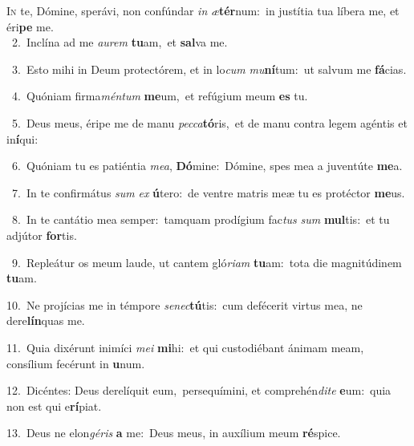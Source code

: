 \lettrine{\initial\textcolor{\initialcolor}{I}}{n} te, Dómine, sperávi, non confúndar \textit{in} \textit{æ}\-\textbf{tér}num:~\star in justítia tua líbera me, et éri\textbf{pe} me.\\
{\numbfont\textcolor{\numbcolor}{~2.}}~Inclína ad me \textit{au}\-\textit{rem} \textbf{tu}\-am,~\star et \textbf{sal}\-va me.\par
{\numbfont\textcolor{\numbcolor}{~3.}}~Esto mihi in Deum protectórem, et in lo\textit{cum} \textit{mu}\-\textbf{ní}tum:~\star ut salvum me \textbf{fá}\-cias.\par
{\numbfont\textcolor{\numbcolor}{~4.}}~Quóniam firma\-\textit{mén}\-\textit{tum} \textbf{me}\-um,~\star et refúgium meum \textbf{es} tu.\par
{\numbfont\textcolor{\numbcolor}{~5.}}~Deus meus, éripe me de manu \textit{pec}\-\textit{ca}\textbf{tó}ris,~\star et de manu contra legem agéntis et in\-\textbf{í}\-qui:\par
{\numbfont\textcolor{\numbcolor}{~6.}}~Quóniam tu es patiéntia \textit{me}\-\textit{a}, \textbf{Dó}\-mine:~\star Dómine, spes mea a juventúte \textbf{me}\-a.\par
{\numbfont\textcolor{\numbcolor}{~7.}}~In te confirmátus \textit{sum} \textit{ex} \textbf{ú}\-tero:~\star de ventre matris meæ tu es protéctor \textbf{me}\-us.\par
{\numbfont\textcolor{\numbcolor}{~8.}}~In te cantátio mea semper:~\dagger tamquam prodígium fac\textit{tus} \textit{sum} \textbf{mul}\-tis:~\star et tu adjútor \textbf{for}\-tis.\par
{\numbfont\textcolor{\numbcolor}{~9.}}~Repleátur os meum laude, ut cantem gló\-\textit{ri}\-\textit{am} \textbf{tu}\-am:~\star tota die magnitúdinem \textbf{tu}\-am.\par
{\numbfont\textcolor{\numbcolor}{10.}}~Ne projícias me in témpore \textit{se}\-\textit{nec}\textbf{tú}tis:~\star cum defécerit virtus mea, ne dere\-\textbf{lín}\-quas me.\par
{\numbfont\textcolor{\numbcolor}{11.}}~Quia dixérunt inimíci \textit{me}\-\textit{i} \textbf{mi}\-hi:~\star et qui custodiébant ánimam meam, consílium fecérunt in \textbf{u}\-num.\par
{\numbfont\textcolor{\numbcolor}{12.}}~Dicéntes: Deus derelíquit eum,~\dagger persequímini, et comprehén\-\textit{di}\-\textit{te} \textbf{e}\-um:~\star quia non est qui e\-\textbf{rí}\-piat.\par
{\numbfont\textcolor{\numbcolor}{13.}}~Deus ne elon\-\textit{gé}\-\textit{ris} \textbf{a} me:~\star Deus meus, in auxílium meum \textbf{ré}\-spice.\par
